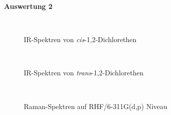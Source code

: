 \documentclass[12pt]{article}
\begin{document}
\begin{onehalfspace}
\textbf{Auswertung 2}

\begin{figure}[!hptb]
    \centering
    \begin{subfigure}[b]{0.4\textwidth}
    \end{subfigure}
    ~ %
    \begin{subfigure}[b]{0.4\textwidth}
    \end{subfigure}
    \caption{IR-Spektren von \textit{cis}-1,2-Dichlorethen}
\end{figure}


\begin{figure}[!hptb]
    \centering
    \begin{subfigure}[b]{0.4\textwidth}
    \end{subfigure}
    ~ %
    \begin{subfigure}[b]{0.4\textwidth}
    \end{subfigure}
        \caption{IR-Spektren von \textit{trans}-1,2-Dichlorethen}

\end{figure}


\begin{figure}[!hptb]
    \centering
    \begin{subfigure}[b]{0.4\textwidth}
    \end{subfigure}
    ~ %
    \begin{subfigure}[b]{0.4\textwidth}
    \end{subfigure}
            \caption{Raman-Spektren auf RHF/6-311G(d,p) Niveau}
\end{figure}


\end{onehalfspace}
\end{document}

